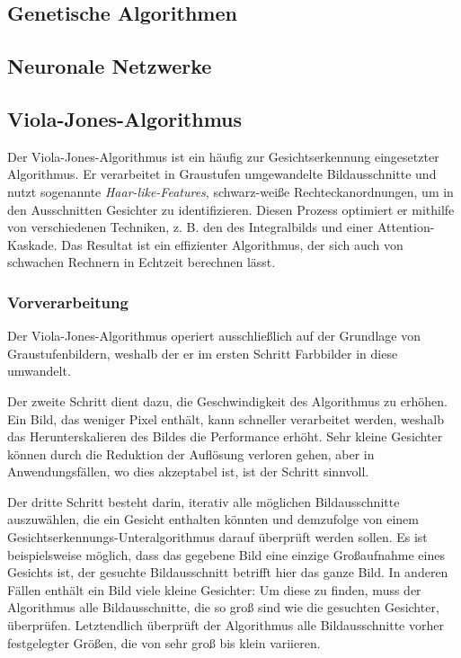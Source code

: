 \documentclass[doktyp=semarbeit, sprache=german]{TUBAFarbeiten}
\begin{document}
\subsection{Genetische Algorithmen}

\subsection{Neuronale Netzwerke}

\subsection{Viola-Jones-Algorithmus}
Der Viola-Jones-Algorithmus ist ein häufig zur Gesichtserkennung eingesetzter Algorithmus. Er verarbeitet in Graustufen umgewandelte Bildausschnitte und nutzt sogenannte \textit{Haar-like-Features}, schwarz-weiße Rechteckanordnungen, um in den Ausschnitten Gesichter zu identifizieren. Diesen Prozess optimiert er mithilfe von verschiedenen Techniken, z. B. den des Integralbilds und einer Attention-Kaskade. Das Resultat ist ein effizienter Algorithmus, der sich auch von schwachen Rechnern in Echtzeit berechnen lässt.

\subsubsection{Vorverarbeitung}
Der Viola-Jones-Algorithmus operiert ausschließlich auf der Grundlage von Graustufenbildern, weshalb der er im ersten Schritt Farbbilder in diese umwandelt.

Der zweite Schritt dient dazu, die Geschwindigkeit des Algorithmus zu erhöhen. Ein Bild, das weniger Pixel enthält, kann schneller verarbeitet werden, weshalb das Herunterskalieren des Bildes die Performance erhöht. Sehr kleine Gesichter können durch die Reduktion der Auflösung verloren gehen, aber in Anwendungsfällen, wo dies akzeptabel ist, ist der Schritt sinnvoll.

Der dritte Schritt besteht darin, iterativ alle möglichen Bildausschnitte auszuwählen, die ein Gesicht enthalten könnten und demzufolge von einem Gesichtserkennungs-Unteralgorithmus darauf überprüft werden sollen. Es ist beispielsweise möglich, dass das gegebene Bild eine einzige Großaufnahme eines Gesichts ist, der gesuchte Bildausschnitt betrifft hier das ganze Bild. In anderen Fällen enthält ein Bild viele kleine Gesichter: Um diese zu finden, muss der Algorithmus alle Bildausschnitte, die so groß sind wie die gesuchten Gesichter, überprüfen. Letztendlich überprüft der Algorithmus alle Bildausschnitte vorher festgelegter Größen, die von sehr groß bis klein variieren.
\end{document}

